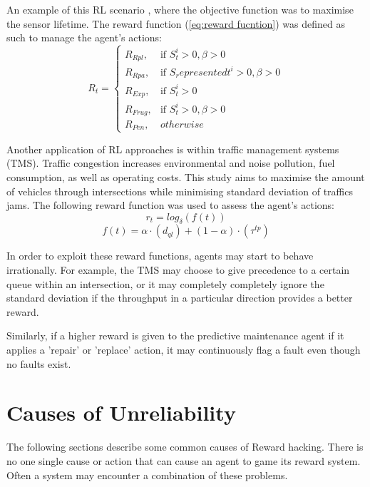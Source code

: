 \documentclass[a4paper,12pt]{report}
\begin{document}
An example of this RL scenario \cite{9221098}, where the objective function was to maximise the sensor lifetime.
The reward function (\ref{eq:reward fucntion}) was defined as such to manage the agent's actions:
\begin{equation}
    \label{eq:reward fucntion}
    R_t = \begin{cases}
        R_{Rpl}, & \text{if } S_t^i > 0, \beta > 0\\
        R_{Rpa}, & \text{if } S_representedt^i > 0, \beta > 0\\
        R_{Exp}, & \text{if } S_t^i > 0\\
        R_{Frug}, & \text{if } S_t^i > 0, \beta > 0\\
        R_{Pen}, & otherwise
    \end{cases}
\end{equation}

Another application of RL approaches is within traffic management systems (TMS). 
Traffic congestion increases environmental and noise pollution, fuel consumption, as well as operating costs.
This study \cite{JOO2020324} aims to maximise the amount of vehicles through intersections while minimising standard deviation of traffics jams.
The following reward function was used to assess the agent's actions:
\begin{equation}
    r_t = log_\delta(f(t))
\end{equation}
\begin{equation}
    f(t) = \alpha \cdot (d_{ql}) + (1 - \alpha)\cdot(\tau^{tp})
\end{equation}

In order to exploit these reward functions, agents may start to behave irrationally. 
For example, the TMS may choose to give precedence to a certain queue within an intersection, or it may completely completely ignore the standard deviation if the throughput in a particular direction provides a better reward.

Similarly, if a higher reward is given to the predictive maintenance agent if it applies a 'repair' or 'replace' action, it may continuously flag a fault even though no faults exist. 

\section{Causes of Unreliability}
The following sections describe some common causes of Reward hacking.
There is no one single cause or action that can cause an agent to game its reward system. 
Often a system may encounter a combination of these problems.
\end{document}
